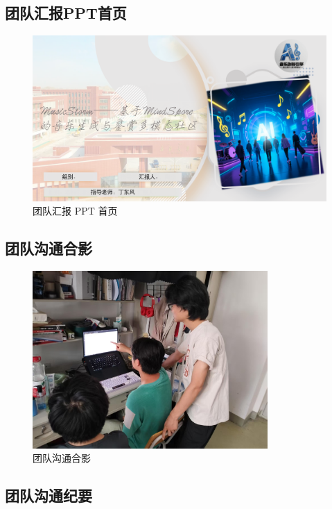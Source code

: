 \documentclass{base}
\numberwithin{figure}{section} %
\begin{document}
\subsection{团队汇报PPT首页}

\begin{figure}[H]
    \centering
    \includegraphics[width=\textwidth]{images/9-2.png}
    \caption{团队汇报 PPT 首页}
\end{figure}

\subsection{团队沟通合影}

\begin{figure}[H]
    \centering
    \includegraphics[width=0.8\textwidth]{images/all.png}
    \caption{团队沟通合影}
    \label{fig:team-photo}
\end{figure}

\subsection{团队沟通纪要}
\end{document}
